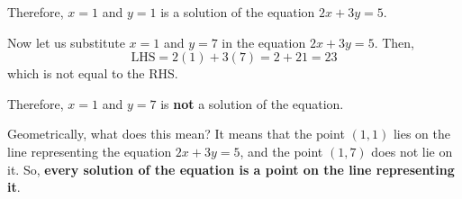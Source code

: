 \documentclass{article}
\begin{document}
\begin{custom}
{\hspace{6em}
Therefore, $x = 1$ and $y = 1$ is a solution of the equation $2x + 3y = 5$.

\hspace{6em}
Now let us substitute $x = 1$ and $y = 7$ in the equation $2x + 3y = 5$. Then,
\vspace{-2em}
\[
\text{LHS} = 2(1) + 3(7) = 2 + 21 = 23
\]
which is not equal to the RHS.

\noindent
Therefore, $x = 1$ and $y = 7$ is \textbf{not} a solution of the equation.

Geometrically, what does this mean? It means that the point $(1, 1)$ lies on the line representing the equation $2x + 3y = 5$, and the point $(1, 7)$ does not lie on it. So, \textbf{every solution of the equation is a point on the line representing it}.
}
\end{custom}
\newpage
\pagestyle{fancy}
\fancyhf{} %
\renewcommand{\headrule}{\color{ncertcyan}\hrule height 3pt}
\justifying
\end{document}
